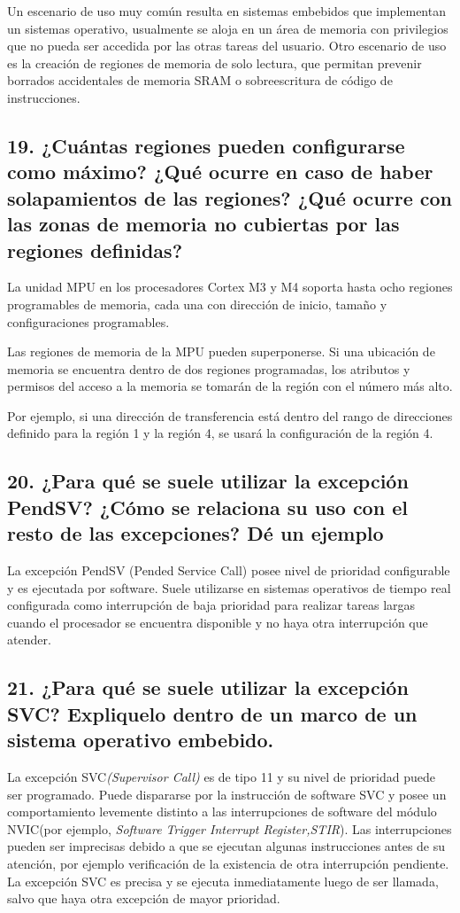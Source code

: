 \documentclass[10pt,a4paper,twoside,spanish]{article}	%
\begin{document}
Un escenario de uso muy común resulta en sistemas embebidos que implementan un sistemas operativo, usualmente se aloja en un área de memoria con privilegios que no pueda ser accedida por las otras tareas del usuario. Otro escenario de uso es la creación de regiones de memoria de solo lectura, que permitan prevenir borrados accidentales de memoria SRAM o sobreescritura de código de instrucciones.

\subsection*{19. ¿Cuántas regiones pueden configurarse como máximo? ¿Qué ocurre en caso de haber solapamientos de las regiones? ¿Qué ocurre con las zonas de memoria no cubiertas por las regiones definidas?}

La unidad MPU en los procesadores Cortex M3 y M4 soporta hasta ocho regiones programables de memoria, cada una con dirección de inicio, tamaño y configuraciones programables.

Las regiones de memoria de la MPU pueden superponerse. Si una ubicación de memoria se encuentra dentro de dos regiones programadas, los atributos y permisos del acceso a la memoria se tomarán de la región con el número más alto.

Por ejemplo, si una dirección de transferencia está dentro del rango de direcciones definido para la región 1 y la región 4, se usará la configuración de la región 4.


\subsection*{20. ¿Para qué se suele utilizar la excepción PendSV? ¿Cómo se relaciona su uso con el resto de las excepciones? Dé un ejemplo}

La excepción  PendSV (Pended Service Call) posee nivel de prioridad configurable y es ejecutada por software. Suele utilizarse en sistemas operativos de tiempo real configurada como interrupción de baja prioridad para realizar tareas largas cuando el procesador se encuentra disponible y no haya otra interrupción que atender.


\subsection*{21. ¿Para qué se suele utilizar la excepción SVC? Expliquelo dentro de un marco de un sistema operativo embebido.}

La excepción SVC\textit{(Supervisor Call)} es de tipo 11 y su nivel de prioridad puede ser programado. Puede dispararse por la instrucción de software SVC y posee un comportamiento levemente distinto a las interrupciones de software del módulo NVIC(por ejemplo, \textit{Software Trigger Interrupt Register,STIR}). Las interrupciones pueden ser imprecisas debido a que se ejecutan algunas instrucciones antes de su atención, por ejemplo verificación de la existencia de otra interrupción pendiente. La excepción SVC es precisa y se ejecuta inmediatamente luego de ser llamada, salvo que haya otra excepción de mayor prioridad.
\end{document}
